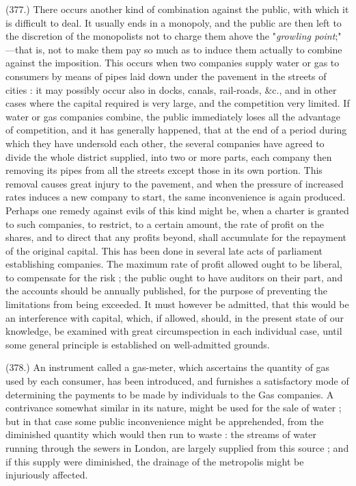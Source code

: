\documentclass{article}
\begin{document}
(377.) There occurs another kind of combination against the public, with which it is difficult to deal. It usually ends in a monopoly, and the public are then left to the discretion of the monopolists not to charge them ahove the "\emph{growling point};" —that is, not to make them pay so much as to induce them actually to combine against the imposition. This occurs when two companies supply water or gas to consumers by means of pipes laid down under the pavement in the streets of cities : it may possibly occur also in docks, canals, rail-roads, \&c., and in other cases where the capital required is very large, and the competition very limited. If water or gas companies combine, the public immediately loses all the advantage of competition, and it has generally happened, that at the end of a period during which they have undersold each other, the several companies have agreed to divide the whole district supplied, into two or more parts, each company then removing its pipes from all the streets except those in its own portion. This removal causes great injury to the pavement, and when the pressure of increased rates induces a new company to start, the same inconvenience is again produced. Perhaps one remedy against evils of this kind might be, when a charter is granted to such companies, to restrict, to a certain amount, the rate of profit on the shares, and to direct that any profits beyond, shall accumulate for the repayment of the original capital. This has been done in several late acts of parliament establishing companies. The maximum rate of profit allowed ought to be liberal, to compensate for the risk ; the public ought to have auditors on their part, and the accounts should be annually published, for the purpose of preventing the limitations from being exceeded. It must however be admitted, that this would be an interference with capital, which, if allowed, should, in the present state of our knowledge, be examined with great circumspection in each individual case, until some general principle is established on well-admitted grounds.


(378.) An instrument called a gas-meter, which ascertains the quantity of gas used by each consumer, has been introduced, and furnishes a satisfactory mode of determining the payments to be made by individuals to the Gas companies. A contrivance somewhat similar in its nature, might be used for the sale of water ; but in that case some public inconvenience might be apprehended, from the diminished quantity which would then run to waste : the streams of water running through the sewers in London, are largely supplied from this source ; and if this supply were diminished, the drainage of the metropolis might be injuriously affected.
\end{document}
